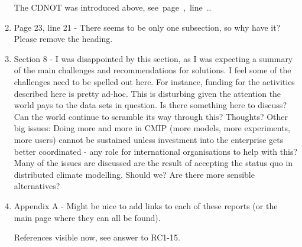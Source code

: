 \documentclass[gmd,manuscript]{copernicus}
\newcommand{\plref}[1]{\mbox{see page \pageref{p-#1}, line
    \lineref{l-#1}.}}
\newenvironment{answer}{\color{blue}}{}
\begin{document}
\begin{enumerate}[label=RC3-\arabic*,leftmargin=*]
  \begin{answer}
    The CDNOT was introduced above, \plref{RC3-22}.
  \end{answer}
\item Page 23, line 21 - There seems to be only one subsection, so why
  have it? Please remove the heading.
\item Section 8 - I was disappointed by this section, as I was
  expecting a summary of the main challenges and recommendations for
  solutions. I feel some of the challenges need to be spelled out
  here. For instance, funding for the activities described here is
  pretty ad-hoc. This is disturbing given the attention the world pays
  to the data sets in question. Is there something here to discuss?
  Can the world continue to scramble its way through this? Thoughts?
  Other big issues: Doing more and more in CMIP (more models, more
  experiments, more users) cannot be sustained unless investment into
  the enterprise gets better coordinated - any role for international
  organisations to help with this? Many of the issues are discussed
  are the result of accepting the status quo in distributed climate
  modelling. Should we? Are there more sensible alternatives?
\item Appendix A - Might be nice to add links to each of these reports
  (or the main page where they can all be found).

  \begin{answer}
    References visible now, see answer to RC1-15.
  \end{answer}
\end{enumerate}
\end{document}
